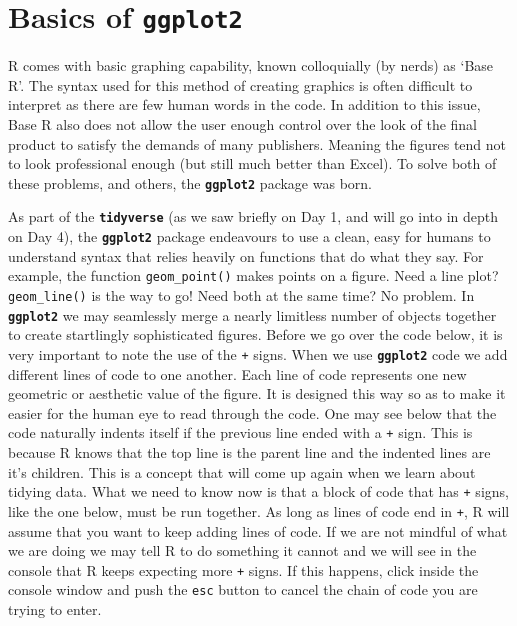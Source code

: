\documentclass[
]{book}
\begin{document}
\hypertarget{basics-of-ggplot2}{%
\section{\texorpdfstring{Basics of \textbf{\texttt{ggplot2}}}{Basics of ggplot2}}\label{basics-of-ggplot2}}

R comes with basic graphing capability, known colloquially (by nerds) as `Base R'. The syntax used for this method of creating graphics is often difficult to interpret as there are few human words in the code. In addition to this issue, Base R also does not allow the user enough control over the look of the final product to satisfy the demands of many publishers. Meaning the figures tend not to look professional enough (but still much better than Excel). To solve both of these problems, and others, the \textbf{\texttt{ggplot2}} package was born.

As part of the \textbf{\texttt{tidyverse}} (as we saw briefly on Day 1, and will go into in depth on Day 4), the \textbf{\texttt{ggplot2}} package endeavours to use a clean, easy for humans to understand syntax that relies heavily on functions that do what they say. For example, the function \texttt{geom\_point()} makes points on a figure. Need a line plot? \texttt{geom\_line()} is the way to go! Need both at the same time? No problem. In \textbf{\texttt{ggplot2}} we may seamlessly merge a nearly limitless number of objects together to create startlingly sophisticated figures. Before we go over the code below, it is very important to note the use of the \texttt{+} signs. When we use \textbf{\texttt{ggplot2}} code we add different lines of code to one another. Each line of code represents one new geometric or aesthetic value of the figure. It is designed this way so as to make it easier for the human eye to read through the code.
One may see below that the code naturally indents itself if the previous line ended with a \texttt{+} sign. This is because R knows that the top line is the parent line and the indented lines are it's children. This is a concept that will come up again when we learn about tidying data. What we need to know now is that a block of code that has \texttt{+} signs, like the one below, must be run together. As long as lines of code end in \texttt{+}, R will assume that you want to keep adding lines of code. If we are not mindful of what we are doing we may tell R to do something it cannot and we will see in the console that R keeps expecting more \texttt{+} signs. If this happens, click inside the console window and push the \texttt{esc} button to cancel the chain of code you are trying to enter.
\end{document}
